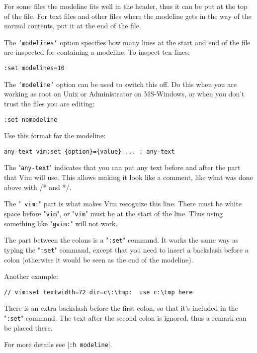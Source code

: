 For some files the modeline fits well in the header, thus it can be put at the top of the file.
For text files and other files where the modeline gets in the way of the normal contents, put it at the end of the file.

The \texttt{'modelines'} option specifies how many lines at the start and end of the file are inspected for containing a modeline.
To inspect ten lines:

\begin{Verbatim}[samepage=true]
 :set modelines=10
\end{Verbatim}

The \texttt{'modeline'} option can be used to switch this off.
Do this when you are working as root on Unix or Administrator on MS-Windows, or when you don't trust the files you are editing:

\begin{Verbatim}[samepage=true]
 :set nomodeline
\end{Verbatim}

Use this format for the modeline:

\begin{Verbatim}[samepage=true]
    any-text vim:set {option}={value} ... : any-text 
\end{Verbatim}

The "\texttt{any-text}" indicates that you can put any text before and after the part that Vim will use.
This allows making it look like a comment, like what was done above with /* and */.

The "\texttt{ vim:}" part is what makes Vim recognize this line.
There must be white space before "\texttt{vim}", or "\texttt{vim}" must be at the start of the line.
Thus using something like "\texttt{gvim:}" will not work.

The part between the colons is a "\texttt{:set}" command.
It works the same way as typing the "\texttt{:set}" command, except that you need to insert a backslash before a colon (otherwise it would be seen as the end of the modeline).

Another example:

\begin{Verbatim}[samepage=true]
    // vim:set textwidth=72 dir=c\:\tmp:  use c:\tmp here 
\end{Verbatim}

There is an extra backslash before the first colon, so that it's included in the "\texttt{:set}" command.
The text after the second colon is ignored, thus a remark can be placed there.

For more details see |\texttt{:h modeline}|.
\clearpage
